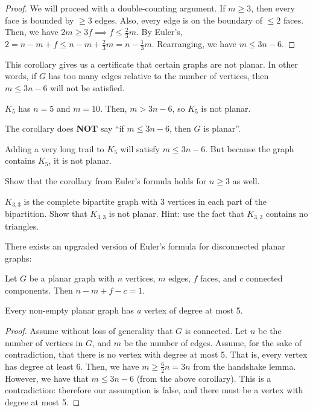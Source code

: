 \documentclass[a4paper]{article}
\begin{document}
\begin{proof}
	We will proceed with a double-counting argument. If \( m\ge 3 \), then every face is bounded by \( \ge 3 \) edges. Also, every edge is on the boundary of \( \le 2 \) faces. Then, we have \( 2m \ge 3f \implies f \le \frac{2}{3}m \). By Euler's, \( 2 = n-m+f\le n-m+\frac{2}{3}m = n - \frac{1}{3}m\). Rearranging, we have \( m \le 3n - 6 \).
\end{proof}

This corollary gives us a certificate that certain graphs are not planar. In other words, if \( G \) has too many edges relative to the number of vertices, then \( m \le 3n-6 \) will not be satisfied.

\begin{eg}
	\( K_5 \) has \( n=5 \) and \( m=10 \). Then, \( m > 3n-6 \), so \( K_5 \) is not planar.
\end{eg}

\begin{note}
	The corollary does \textbf{NOT} say ``if \( m \le  3n - 6 \), then \( G \) is planar''.
\end{note}

\begin{eg}
	Adding a very long trail to \( K_5 \) will satisfy \( m\le 3n-6 \). But because the graph contains \( K_5 \), it is not planar.
\end{eg}

Show that the corollary from Euler's formula holds for \( n\ge 3 \) as well.

\( K_{3,3} \) is the complete bipartite graph with 3 vertices in each part of the bipartition. Show that \( K_{3,3} \) is not planar. Hint: use the fact that \( K_{3,3} \) contains no triangles.


There exists an upgraded version of Euler's formula for disconnected planar graphs:

\begin{theorem}
	Let \( G \) be a planar graph with \( n \) vertices, \( m \) edges, \( f \) faces, and \( c \) connected components. Then \( n - m + f - c= 1 \).
\end{theorem}

\begin{corollary}
	Every non-empty planar graph has \emph{a} vertex of degree at most 5.
\end{corollary}

\begin{proof}
	Assume without loss of generality that \( G \) is connected. Let \( n \) be the number of vertices in \( G \), and \( m \) be the number of edges. Assume, for the sake of contradiction, that there is no vertex with degree at most 5. That is, every vertex has degree at least 6. Then, we have \( m \ge \frac{6}{2}n = 3n \) from the handshake lemma. However, we have that \( m \le 3n-6 \) (from the above corollary). This is a contradiction: therefore our assumption is false, and there must be a vertex with degree at most 5.
\end{proof}
\end{document}
